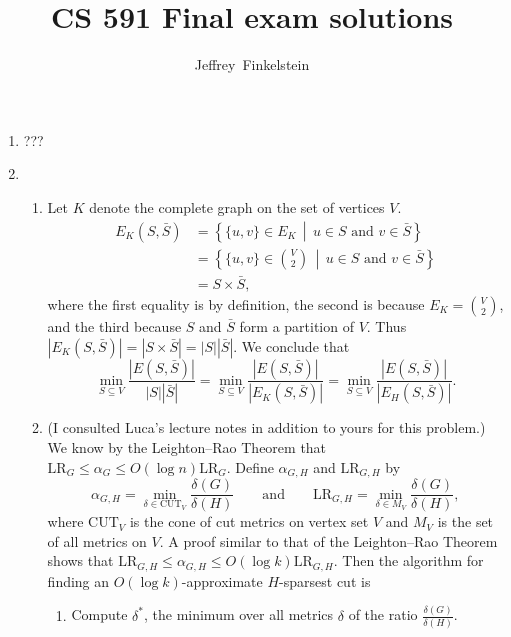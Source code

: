 \documentclass{article}
\author{Jeffrey~Finkelstein}
\title{CS 591 Final exam solutions}
\newcommand{\CUT}{\mathrm{CUT}}
\newcommand{\LR}{\mathrm{LR}}
\newcommand{\0}{\mathbf{0}}
\begin{document}
\maketitle


\begin{enumerate}
\item ???
\item
  \begin{enumerate}
  \item Let $K$ denote the complete graph on the set of vertices $V$.
    \begin{align*}
      E_K(S, \bar{S}) & = \left\{ \{u, v\} \in E_K \, \middle| \, u \in S \text{ and } v \in \bar{S}\right\} \\
      & = \left\{ \{u, v\} \in \binom{V}{2} \, \middle| \, u \in S \text{ and } v \in \bar{S}\right\} \\
      & = S \times \bar{S},
    \end{align*}
    where the first equality is by definition, the second is because $E_K = \binom{V}{2}$, and the third because $S$ and $\bar{S}$ form a partition of $V$.
    Thus $|E_K(S, \bar{S})| = |S \times \bar{S}| = |S| |\bar{S}|$.
    We conclude that
    \begin{equation*}
      \min_{S \subseteq V} \frac{|E(S, \bar{S})|}{|S| |\bar{S}|}
      =
      \min_{S \subseteq V} \frac{|E(S, \bar{S})|}{|E_K(S, \bar{S})|}
      =
      \min_{S \subseteq V} \frac{|E(S, \bar{S})|}{|E_H(S, \bar{S})|}.
    \end{equation*}
  \item (I consulted Luca's lecture notes in addition to yours for this problem.)
    We know by the Leighton--Rao Theorem that $\LR_G \leq \alpha_G \leq O(\log n) \LR_G$.
    Define $\alpha_{G, H}$ and $\LR_{G, H}$ by
    \begin{equation*}
      \alpha_{G, H} = \min_{\delta \in \CUT_V} \frac{\delta(G)}{\delta(H)}
      \qquad \text{and} \qquad
      \LR_{G, H} = \min_{\delta \in M_V} \frac{\delta(G)}{\delta(H)},
    \end{equation*}
    where $\CUT_V$ is the cone of cut metrics on vertex set $V$ and $M_V$ is the set of all metrics on $V$.
    A proof similar to that of the Leighton--Rao Theorem shows that $\LR_{G, H} \leq \alpha_{G, H} \leq O(\log k) \LR_{G, H}$.
    Then the algorithm for finding an $O(\log k)$-approximate $H$-sparsest cut is
    \begin{enumerate}
    \item Compute $\delta^*$, the minimum over all metrics $\delta$ of the ratio $\frac{\delta(G)}{\delta(H)}$.

\end{enumerate}
\end{enumerate}
\end{enumerate}
\end{document}
